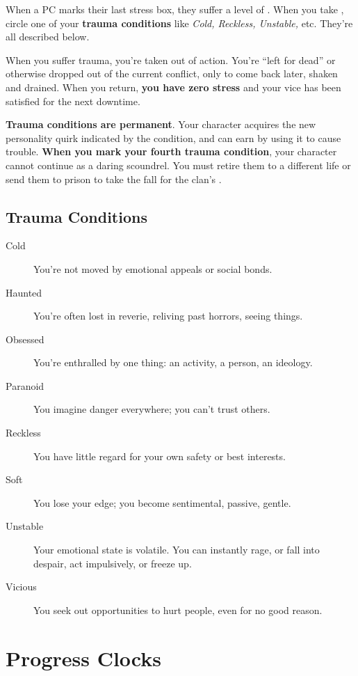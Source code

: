 When a PC marks their last stress box, they suffer a level of . When you take , circle one of your \textbf{trauma conditions} like \emph{Cold, Reckless, Unstable,} etc. They’re all described below.

When you suffer trauma, you’re taken out of action. You’re ``left for dead'' or otherwise dropped out of the current conflict, only to come back later, shaken and drained. When you return, \textbf{you have zero stress} and your vice has been satisfied for the next downtime.

\textbf{Trauma conditions are permanent}. Your character acquires the new personality quirk indicated by the condition, and can earn  by using it to cause trouble. \textbf{When you mark your fourth trauma condition}, your character cannot continue as a daring scoundrel. You must retire them to a different life or send them to prison to take the fall for the clan’s .

\subsection{Trauma Conditions}

\begin{description}
\item[Cold] You’re not moved by emotional appeals or social bonds.
\item[Haunted] You’re often lost in reverie, reliving past horrors, seeing things.
\item[Obsessed] You’re enthralled by one thing: an activity, a person, an ideology.
\item[Paranoid] You imagine danger everywhere; you can’t trust others.
\item[Reckless] You have little regard for your own safety or best interests.
\item[Soft] You lose your edge; you become sentimental, passive, gentle.
\item[Unstable] Your emotional state is volatile. You can instantly rage, or fall into despair, act impulsively, or freeze up.
\item[Vicious] You seek out opportunities to hurt people, even for no good reason.
\end{description}

\section{Progress Clocks}

